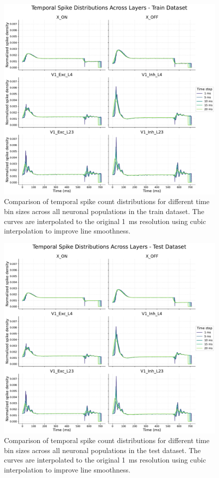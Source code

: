 \begin{figure}
    \centering
    \includegraphics[width=\linewidth]{img/plots/temporal_spike_distribution_train.pdf}
    \caption{Comparison of temporal spike count distributions for different time bin sizes across all neuronal populations in the train dataset. The curves are interpolated to the original 1~ms resolution using cubic interpolation to improve line smoothness.}
    \label{fig:temporal_spike_distribution_train}
\end{figure}

\begin{figure}
    \centering
    \includegraphics[width=\linewidth]{img/plots/temporal_spike_distribution_test.pdf}
    \caption{Comparison of temporal spike count distributions for different time bin sizes across all neuronal populations in the test dataset. The curves are interpolated to the original 1~ms resolution using cubic interpolation to improve line smoothness.}
    \label{fig:temporal_spike_distribution_test}
\end{figure}

